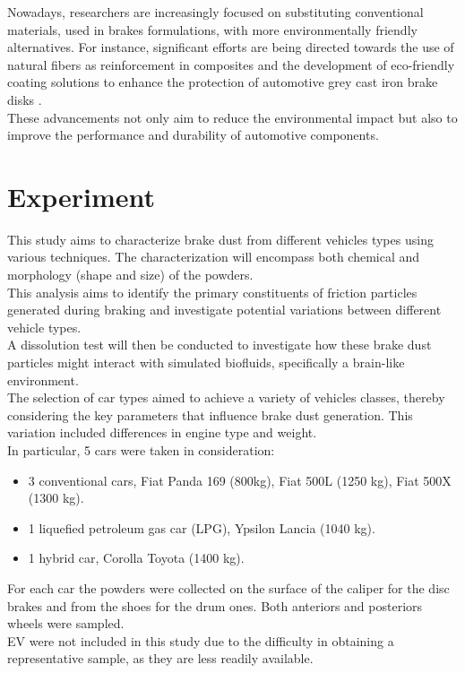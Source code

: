 Nowadays, researchers are increasingly focused on substituting conventional materials, used in brakes formulations, with more environmentally friendly alternatives. For instance, significant efforts are being directed towards the use of natural fibers as reinforcement in composites \cite{hemanth2023eco} and the development of eco-friendly coating solutions to enhance the protection of automotive grey cast iron brake disks \cite{wank2023environmentally}. \\
These advancements not only aim to reduce the environmental impact but also to improve the performance and durability of automotive components.



\section{Experiment}

This study aims to characterize brake dust from different vehicles types using various techniques.
The characterization will encompass both chemical and morphology (shape and size) of the powders. \\
This analysis aims to identify the primary constituents of friction particles generated during braking and investigate potential variations between different vehicle types. \\
A dissolution test will then be conducted to investigate how these brake dust particles might interact with simulated biofluids, specifically a brain-like environment. \\
The selection of car types aimed to achieve a variety of vehicles classes, thereby considering the key parameters that influence brake dust generation. This variation included differences in engine type and weight. \\
In particular, 5 cars were taken in consideration: 
\begin{itemize}
    \item 3 conventional cars, Fiat Panda 169 (800kg), Fiat 500L (1250 kg), Fiat 500X (1300 kg).
    \item 1 liquefied petroleum gas car (LPG), Ypsilon Lancia (1040 kg). \\
    \item 1 hybrid car, Corolla Toyota (1400 kg).
\end{itemize}

For each car the powders were collected on the surface of the caliper for the disc brakes and from the shoes for the drum ones. Both anteriors and posteriors wheels were sampled. \\
EV were not included in this study due to the difficulty in obtaining a representative sample, as they are less readily available.

  









